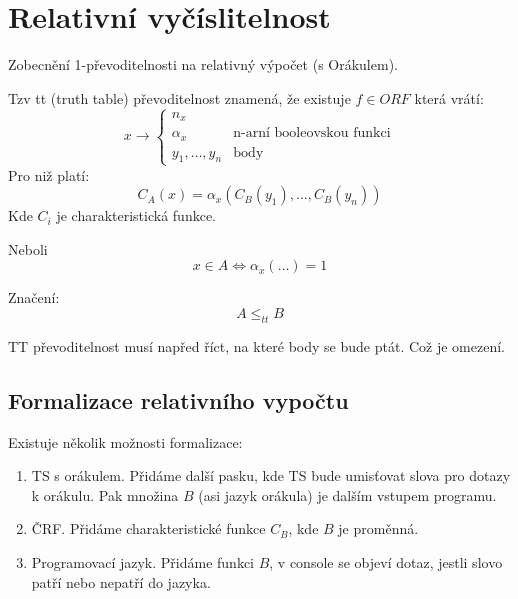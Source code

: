 \section{\texorpdfstring{Relativní vyčíslitelnost}{Relativní vyčíslitelnost}}
\vspace{5mm}
\large

Zobecnění 1-převoditelnosti na relativný výpočet (s Orákulem).

\begin{definition}[tt-Převoditelnost]
	Tzv tt (truth table) převoditelnost znamená, že existuje $f \in ORF$ která vrátí:
	\[ x \to
		\left\{
		\begin{array}{lll}
			n_x \\
			\alpha_x & \text{n-arní booleovskou funkci} \\
			y_1, \ldots, y_n & \text{body}
		\end{array}
		\right.
	\]
	Pro niž platí:
	\[ C_A(x) = \alpha_x(C_B(y_1), \ldots, C_B(y_n))\]
	Kde $C_i$ je charakteristická funkce.

	Neboli
	\[ x \in A \iff \alpha_x(\ldots) = 1 \]

	Značení:
	\[ A \leq_{tt} B \]
\end{definition}

\begin{note}
	TT převoditelnost musí napřed říct, na které body se bude ptát.
	Což je omezení.
\end{note}

\subsection{Formalizace relativního vypočtu}

Existuje několik možnosti formalizace:
\begin{definition}
	\begin{enumerate}
		\item TS s orákulem. Přidáme další pasku, kde TS bude umisťovat slova pro dotazy k orákulu.
			Pak množina $B$ (asi jazyk orákula) je dalším vstupem programu.
		\item ČRF. Přidáme charakteristické funkce $C_B$, kde $B$ je proměnná.
		\item Programovací jazyk. Přidáme funkci $B$, v console se objeví dotaz, jestli slovo patří nebo nepatří do jazyka.
	\end{enumerate}
\end{definition}

